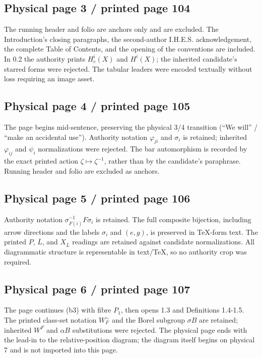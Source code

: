 \documentclass[10pt]{article}
\begin{document}
\subsection*{Physical page 3 / printed page 104}

The running header and folio are anchors only and are excluded. The Introduction's closing paragraphs, the second-author I.H.E.S. acknowledgement, the complete Table of Contents, and the opening of the conventions are included. In 0.2 the authority prints \(H_c^i(X)\) and \(H^i(X)\); the inherited candidate's starred forms were rejected. The tabular leaders were encoded textually without loss requiring an image asset.\par

\subsection*{Physical page 4 / printed page 105}

The page begins mid-sentence, preserving the physical 3/4 transition (“We will” / “make an accidental use”). Authority notation \(\varphi_{ji}\) and \(\sigma_i\) is retained; inherited \(\varphi_{ij}\) and \(\psi_i\) normalizations were rejected. The bar automorphism is recorded by the exact printed action \(\zeta\mapsto\zeta^{-1}\), rather than by the candidate's paraphrase. Running header and folio are excluded as anchors.\par

\subsection*{Physical page 5 / printed page 106}

Authority notation \(\sigma_{F(i)}^{-1}F\sigma_i\) is retained. The full composite bijection, including arrow directions and the labels \(\sigma_i\) and \((e,g)\), is preserved in TeX-form text. The printed \(P\), \(\overline L\), and \(X_{\overline L}\) readings are retained against candidate normalizations. All diagrammatic structure is representable in text/TeX, so no authority crop was required.\par

\subsection*{Physical page 6 / printed page 107}

The page continues (b3) with fibre \(P_1\), then opens 1.3 and Definitions 1.4-1.5. The printed class-set notation \(W_F^{\sim}\) and the Borel subgroup \(\sigma B\) are retained; inherited \(W^F\) and \(\alpha B\) substitutions were rejected. The physical page ends with the lead-in to the relative-position diagram; the diagram itself begins on physical 7 and is not imported into this page.\par
\end{document}
